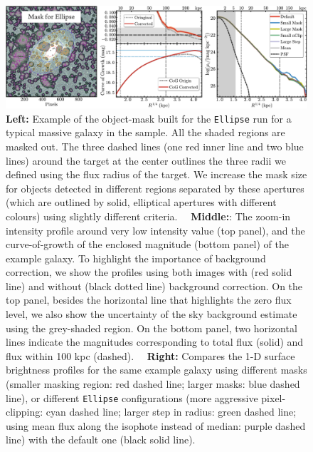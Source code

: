 \documentclass[fleqn,usenatbib]{mnras}
\begin{document}
    \begin{figure}
        \centering 
        \includegraphics[width=\textwidth]{fig/redbcg_ellipse_tech}
        \caption{
            \textbf{Left:} Example of the object-mask built for the \texttt{Ellipse}
            run for a typical massive galaxy in the sample. 
            All the shaded regions are masked out. 
            The three dashed lines (one red inner line and two blue lines) around 
            the target at the center outlines the three radii we defined using the 
            flux radius of the target.  
            We increase the mask size for objects detected in different regions 
            separated by these apertures (which are outlined by solid, elliptical 
            apertures with different colours) using slightly different criteria.~~
            \textbf{Middle:}: The zoom-in intensity profile around very low intensity 
            value (top panel), and the curve-of-growth of the enclosed magnitude 
            (bottom panel) of the example galaxy.  
            To highlight the importance of background correction, we show the profiles 
            using both images with (red solid line) and without (black dotted line) 
            background correction. 
            On the top panel, besides the horizontal line that highlights the zero flux 
            level, we also show the uncertainty of the sky background estimate using 
            the grey-shaded region.  
            On the bottom panel, two horizontal lines indicate the magnitudes 
            corresponding to total flux (solid) and flux within 100 kpc (dashed).~~
            \textbf{Right:} Compares the 1-D surface brightness profiles for the same 
            example galaxy using different masks 
            (smaller masking region: red dashed line; larger masks: blue dashed line), 
            or different \texttt{Ellipse} configurations
            (more aggressive pixel-clipping: cyan dashed line; 
            larger step in radius: green dashed line; 
            using mean flux along the isophote instead of median: purple dashed line)
            with the default one (black solid line).
            }
        \label{fig:ell_tech}
    \end{figure}
    
\end{document}
